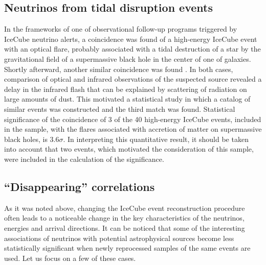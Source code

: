 \documentclass[a4paper,noshowpacs,noshowkeys,floatfix,twocolumn,preprintnumbers,nofootinbib]{revtex4-2}
\begin{document}
\subsection{Neutrinos from tidal disruption events}
\label{sec:extragal:TDE}
In the frameworks of one of observational follow-up programs triggered by IceCube neutrino alerts, a coincidence was found \cite{TDE1} of a high-energy IceCube event with an optical flare, probably associated with a tidal destruction of a star by the gravitational field of a supermassive black hole in the center of one of galaxies. Shortly afterward, another similar coincidence was found \cite{TDE2}. In both cases, comparison of optical and infrared observations of the suspected source revealed a delay in the infrared flash that can be explained by scattering of radiation on large amounts of dust. This motivated a statistical study \cite{TDEcorr2021} in which a catalog of similar events was constructed and the third match was found. Statistical significance of the coincidence of 3 of the 40 high-energy IceCube events, included in the sample, with the flares associated with accretion of matter on supermassive black holes, is $3.6\sigma$. In interpreting this quantitative result, it should be taken into account that two events, which motivated the consideration of this sample, were included in the calculation of the significance.


\subsection {``Disappearing'' correlations}
\label{sec:extragal:disapp}
As it was noted above, changing the IceCube event reconstruction procedure often leads to a noticeable change in the key characteristics of the neutrinos, energies and arrival directions. It can be noticed that some of the interesting associations of neutrinos with potential astrophysical sources become less statistically significant when newly reprocessed samples of the same events are used. Let us focus on a few of these cases.
\end{document}
